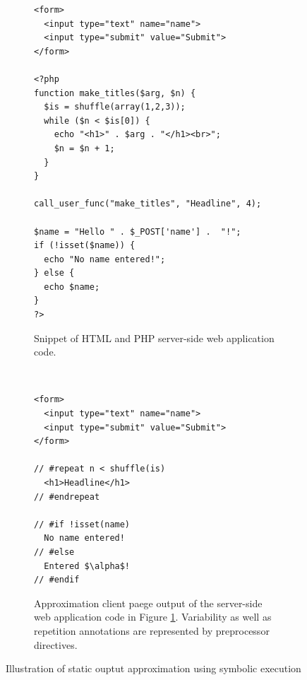 \documentclass[preprint]{sig-alternate-05-2015}
\begin{document}
\begin{figure}[t]
	\centering
	\begin{subfigure}[center]{0.48\textwidth}%
\begin{lstlisting}
<form>
  <input type="text" name="name">
  <input type="submit" value="Submit">
</form>

<?php
function make_titles($arg, $n) {
  $is = shuffle(array(1,2,3));
  while ($n < $is[0]) {
    echo "<h1>" . $arg . "</h1><br>";
    $n = $n + 1;
  }
}
  
call_user_func("make_titles", "Headline", 4);

$name = "Hello " . $_POST['name'] .  "!";
if (!isset($name)) {
  echo "No name entered!";
} else {
  echo $name;
}
?>
\end{lstlisting}
		\caption{Snippet of HTML and PHP server-side web application code. \label{fig:example_code}}
    \end{subfigure}

	\vspace{2mm}    
    
    ~ %
    \begin{subfigure}[center]{0.48\textwidth}
\begin{lstlisting}[mathescape]
<form>
  <input type="text" name="name">
  <input type="submit" value="Submit">
</form>

// #repeat n < shuffle(is)
  <h1>Headline</h1>
// #endrepeat

// #if !isset(name)
  No name entered!
// #else
  Entered $\alpha$!
// #endif

\end{lstlisting}
		\caption{Approximation client paege output of the server-side web application code in Figure \ref{fig:example_code}. Variability as well as repetition annotations are represented by preprocessor directives.\label{fig:output_example}}
    \end{subfigure}
    \vspace{2mm}
    \caption{Illustration of static ouptut approximation using symbolic
    execution}
\end{figure}

\end{document}

